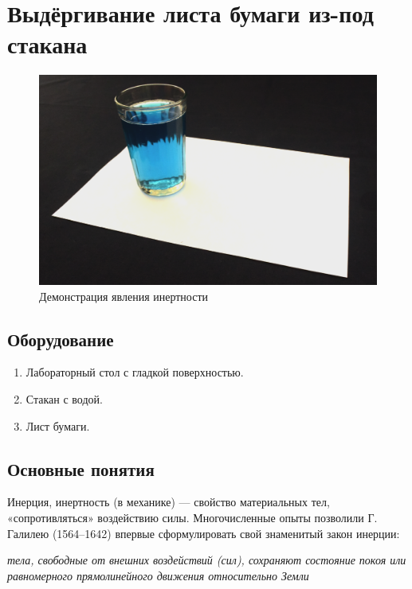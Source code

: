\documentclass[../../../All.tex]{subfiles}
\begin{document}
	

	\section{Выдёргивание листа бумаги из-под стакана}


\begin{figure}[H] 	
	\centering 	
	\includegraphics[width=0.7\linewidth]{inertia-1.png}
	\caption{Демонстрация явления инертности}
\end{figure}

\subsection*{\textcolor{PineGreen}{Оборудование}}

\begin{enumerate}
\item Лабораторный стол с гладкой поверхностью.
\item Стакан с водой.
\item Лист бумаги.
\end{enumerate}

\subsection*{\textcolor{PineGreen}{Основные понятия}}

Инерция, инертность (в механике) — свойство материальных тел, «сопротивляться» воздействию силы.
Многочисленные опыты позволили Г. Галилею (1564–1642) впервые сформулировать свой знаменитый закон инерции:

\begin{flushleft}
	
	\textit{тела, свободные от внешних воздействий (сил), сохраняют состояние 
покоя или равномерного прямолинейного движения относительно 
Земли}
\end{flushleft}
\end{document}
